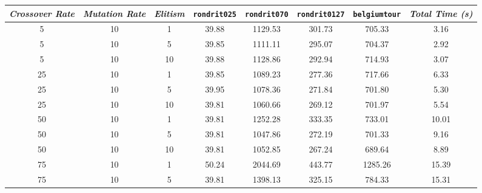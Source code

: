 

\begin{table}[H]
\centering
\footnotesize
{\renewcommand{\arraystretch}{1}}
\begin{tabular}{ccc|c|c|c|c|c}
\textit{Crossover Rate} & \textit{Mutation Rate} & \textit{Elitism} & \texttt{rondrit025} & \texttt{rondrit070} & \texttt{rondrit0127} & \texttt{belgiumtour} & \textit{Total Time (s)} \\\hline
5 & 10 & 1 & \cellcolor{gray!80}39.88 & \cellcolor{gray!13}1129.53 & \cellcolor{gray!1}301.73 & \cellcolor{gray!67}705.33 & 3.16\\
5 & 10 & 5 & \cellcolor{gray!80}39.85 & \cellcolor{gray!16}1111.11 & \cellcolor{gray!1}295.07 & \cellcolor{gray!67}704.37 & 2.92\\
5 & 10 & 10 & \cellcolor{gray!80}39.88 & \cellcolor{gray!13}1128.86 & \cellcolor{gray!1}292.94 & \cellcolor{gray!64}714.93 & 3.07\\
25 & 10 & 1 & \cellcolor{gray!80}39.85 & \cellcolor{gray!20}1089.23 & \cellcolor{gray!1}277.36 & \cellcolor{gray!63}717.66 & 6.33\\
25 & 10 & 5 & \cellcolor{gray!79}39.95 & \cellcolor{gray!22}1078.36 & \cellcolor{gray!1}271.84 & \cellcolor{gray!68}701.80 & 5.30\\
25 & 10 & 10 & \cellcolor{gray!80}39.81 & \cellcolor{gray!25}1060.66 & \cellcolor{gray!1}269.12 & \cellcolor{gray!68}701.97 & 5.54\\
50 & 10 & 1 & \cellcolor{gray!80}39.81 & \cellcolor{gray!1}1252.28 & \cellcolor{gray!1}333.35 & \cellcolor{gray!58}733.01 & 10.01\\
50 & 10 & 5 & \cellcolor{gray!80}39.81 & \cellcolor{gray!27}1047.86 & \cellcolor{gray!1}272.19 & \cellcolor{gray!68}701.33 & 9.16\\
50 & 10 & 10 & \cellcolor{gray!80}39.81 & \cellcolor{gray!26}1052.85 & \cellcolor{gray!1}267.24 & \cellcolor{gray!71}689.64 & 8.89\\
75 & 10 & 1 & \cellcolor{gray!1}50.24 & \cellcolor{gray!1}2044.69 & \cellcolor{gray!1}443.77 & \cellcolor{gray!1}1285.26 & 15.39\\
75 & 10 & 5 & \cellcolor{gray!80}39.81 & \cellcolor{gray!1}1398.13 & \cellcolor{gray!1}325.15 & \cellcolor{gray!42}784.33 & 15.31\\

\end{tabular}
\end{table}
